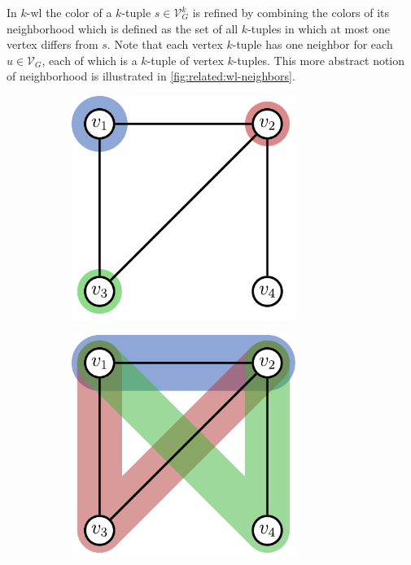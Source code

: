 In $k$-\acs{wl} the color of a $k$-tuple $s \in \mathcal{V}_G^k$ is refined by combining the colors of its neighborhood which is defined as the set of all $k$-tuples in which at most one vertex differs from $s$.
Note that each vertex $k$-tuple has one neighbor for each $u \in \mathcal{V}_G$, each of which is a $k$-tuple of vertex $k$-tuples.
This more abstract notion of neighborhood is illustrated in \cref{fig:related:wl-neighbors}.
\begin{figure}[ht]
	\centering
	\begin{subfigure}{0.32\textwidth}
		\centering
		\includegraphics[width=0.8\textwidth]{gfx/related-work/wl1-neighbors.pdf}
		\label{fig:related:wl-neighbors:1}
	\end{subfigure}%
	\begin{subfigure}{0.32\textwidth}
		\centering
		\includegraphics[width=0.8\textwidth]{gfx/related-work/wl2-neighbors.pdf}

\end{subfigure}
\end{figure}
